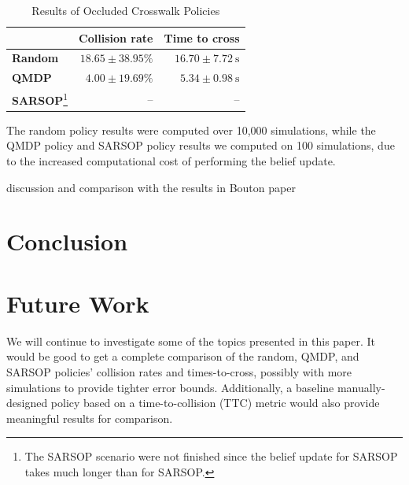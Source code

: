 \documentclass[conference]{IEEEtran}
\begin{document}
\begin{table}[htbp]
    \caption{Results of Occluded Crosswalk Policies}
    \begin{center}
        \begin{tabular}{lrr}
            \hline \hline
             & \textbf{Collision rate} \hspace{3pt} & \textbf{Time to cross} \hspace{1pt} \\
            \hline
            \textbf{Random} & $18.65 \pm 38.95\%$ & $16.70 \pm 7.72 ~\si{\second}$ \\
            \textbf{QMDP}   & $4.00 \pm 19.69\%$  & $5.34 \pm 0.98 ~\si{\second}$ \\
            \textbf{SARSOP}\footnote{The SARSOP scenario were not finished since the belief update for SARSOP takes much longer than for SARSOP.} & -- & -- \\
            \hline \hline
        \end{tabular}
        \label{tab1}
    \end{center}
\end{table}

The random policy results were computed over 10,000 simulations, while the QMDP policy and SARSOP policy results we computed on 100 simulations, due to the increased computational cost of performing the belief update.

discussion and comparison with the results in Bouton paper

\section{Conclusion}
\label{sec:conclusion}


\section{Future Work}
\label{sec:future-work}

We will continue to investigate some of the topics presented in this paper. It would be good to get a complete comparison of the random, QMDP, and SARSOP policies' collision rates and times-to-cross, possibly with more simulations to provide tighter error bounds. Additionally, a baseline manually-designed policy based on a time-to-collision (TTC) metric would also provide meaningful results for comparison.
\end{document}
